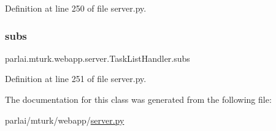 Definition at line 250 of file server.\+py.

\mbox{\label{classparlai_1_1mturk_1_1webapp_1_1server_1_1TaskListHandler_a9cbeab910d93da1b08334339c3a93bdf}} 
\subsubsection{\texorpdfstring{subs}{subs}}
{\footnotesize\ttfamily parlai.\+mturk.\+webapp.\+server.\+Task\+List\+Handler.\+subs}



Definition at line 251 of file server.\+py.



The documentation for this class was generated from the following file\+:\begin{DoxyCompactItemize}
\item 
parlai/mturk/webapp/\hyperlink{server_8py}{server.\+py}\end{DoxyCompactItemize}
